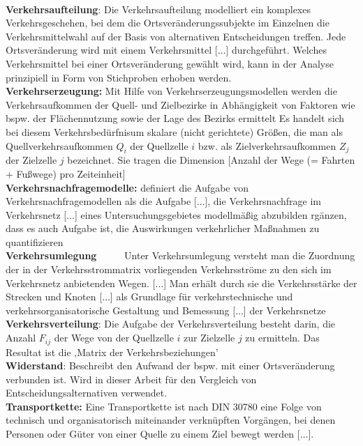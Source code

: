 \begin{figure}[htbp]
  \centering
  \caption{}
  \label{}
\end{figure}
~\\
\textbf{Verkehrsaufteilung}: \glqq Die Verkehrsaufteilung modelliert ein komplexes Verkehrsgeschehen, bei dem die Ortsveränderungssubjekte im Einzelnen die Verkehrsmittelwahl auf der Basis von alternativen Entscheidungen treffen. Jede Ortsveränderung wird mit einem Verkehrsmittel [$\ldots$] durchgeführt. Welches Verkehrsmittel bei einer Ortsveränderung gewählt wird, kann in der Analyse prinzipiell in Form von Stichproben erhoben werden.\grqq   \autocites[][]{bib.213}~\\
\textbf{Verkehrserzeugung:} Mit Hilfe von Verkehrserzeugungsmodellen werden die Verkehrsaufkommen der Quell- und Zielbezirke in Abhängigkeit von Faktoren wie bspw. der Flächennutzung sowie der Lage des Bezirks ermittelt  \autocites[][]{bib.213} \autocites[][]{bib.248} \glqq Es handelt sich bei diesem \glqq Verkehrsbedürfnis\grqq  um \glqq skalare (nicht gerichtete) Größen, die man als Quellverkehrsaufkommen ${{Q}_{i}}$ der Quellzelle $i$ bzw. als Zielverkehrsaufkommen ${{Z}_{j}}$ der Zielzelle $j$ \emph{ }bezeichnet. Sie tragen die Dimension [Anzahl der Wege (= Fahrten + Fußwege) pro Zeiteinheit]\grqq   \autocites[][]{bib.248}~\\
\textbf{Verkehrsnachfragemodelle:}  \citeauthor{bib.248} definiert die Aufgabe von Verkehrsnachfragemodellen als die \glqq Aufgabe [$\ldots$], die Verkehrsnachfrage im Verkehrsnetz [$\ldots$] eines Untersuchungsgebietes modellmäßig abzubilden\grqq   \autocites[][]{bib.248}  \citeauthor{bib.87} rgänzen, dass es auch Aufgabe ist, die Auswirkungen verkehrlicher Maßnahmen zu quantifizieren  \autocites[][]{bib.87}~\\
\textbf{Verkehrsumlegung }~~~~~\glqq Unter Verkehrsumlegung versteht man die Zuordnung der in der Verkehrsstrommatrix vorliegenden Verkehrsströme zu den sich im Verkehrsnetz anbietenden Wegen. [$\ldots$] Man erhält durch sie die Verkehrsstärke der Strecken und Knoten [$\ldots$] als Grundlage für verkehrstechnische und verkehrsorganisatorische Gestaltung und Bemessung [$\ldots$] der Verkehrsnetze\grqq   \autocites[][]{bib.213}~\\
\textbf{Verkehrsverteilung}: \glqq Die Aufgabe der Verkehrsverteilung besteht darin, die Anzahl ${{F}_{ij}}$ der Wege von der Quellzelle $i$ zur Zielzelle $j$ zu ermitteln. Das Resultat ist die ‚Matrix der Verkehrsbeziehungen’\grqq   \autocites[][]{bib.248} ~\\
\textbf{Widerstand}: Beschreibt den Aufwand der bspw. mit einer Ortsveränderung verbunden ist. Wird in dieser Arbeit für den Vergleich von Entscheidungsalternativen verwendet.~\\
\textbf{Transportkette}\textbf{: }Eine Transportkette ist \glqq nach DIN 30780 eine Folge von technisch und organisatorisch miteinander verknüpften Vorgängen, bei denen Personen oder Güter von einer Quelle zu einem Ziel bewegt werden [$\ldots$]. ~\\

